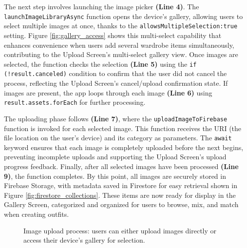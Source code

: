 The next step involves launching the image picker \textbf{(Line 4)}. The \texttt{launchImageLibraryAsync} function opens the device’s gallery, allowing users to select multiple images at once, thanks to the \texttt{allowsMultipleSelection:true} setting. Figure \ref{fig:gallery_access}  shows this multi-select capability that enhances convenience when users add several wardrobe items simultaneously, contributing to the Upload Screen's multi-select gallery view. Once images are selected, the function checks the selection \textbf{(Line 5)} using the \texttt{if (!result.canceled)} condition to confirm that the user did not cancel the process, reflecting the Upload Screen's cancel/upload confirmation state. If images are present, the app loops through each image \textbf{(Line 6)} using \texttt{result.assets.forEach} for further processing.

The uploading phase follows \textbf{(Line 7)}, where the \texttt{uploadImageToFirebase} function is invoked for each selected image. This function receives the URI (the file location on the user’s device) and its category as parameters. The \texttt{await} keyword ensures that each image is completely uploaded before the next begins, preventing incomplete uploads and supporting the Upload Screen's upload progress feedback. Finally, after all selected images have been processed \textbf{(Line 9)}, the function completes. By this point, all images are securely stored in Firebase Storage, with metadata saved in Firestore for easy retrieval shown in Figure \ref{fig:firestore_collections}. These items are now ready for display in the Gallery Screen, categorized and organized for users to browse, mix, and match when creating outfits.

\begin{figure}[!ht]
    \centering
    \qquad %
    \caption{Image upload process: users can either upload images directly or access their device's gallery for selection.}
    \label{fig:image_upload_flow}
\end{figure}

